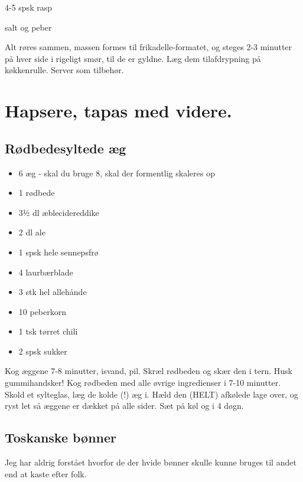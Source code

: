 \documentclass[
  letterpaper,
  DIV=11,
  numbers=noendperiod]{scrreprt}
\providecommand{\tightlist}{%
  \setlength{\itemsep}{0pt}\setlength{\parskip}{0pt}}\usepackage{longtable,booktabs,array}
\begin{document}
4-5 spsk rasp

salt og peber

Alt røres sammen, massen formes til frikadelle-formatet, og steges 2-3
minutter på hver side i rigeligt smør, til de er gyldne. Læg dem
tilafdrypning på køkkenrulle. Server som tilbehør.


\hypertarget{hapsere-tapas-med-videre.}{%
\chapter{Hapsere, tapas med videre.}\label{hapsere-tapas-med-videre.}}

\hypertarget{ruxf8dbedesyltede-uxe6g}{%
\section{Rødbedesyltede æg}\label{ruxf8dbedesyltede-uxe6g}}

\begin{itemize}
\tightlist
\item
  6 æg - skal du bruge 8, skal der formentlig skaleres op
\item
  1 rødbede
\item
  3½ dl æblecidereddike
\item
  2 dl ale
\item
  1 spsk hele sennepsfrø
\item
  4 laurbærblade
\item
  3 stk hel allehånde
\item
  10 peberkorn
\item
  1 tsk tørret chili
\item
  2 spsk sukker
\end{itemize}

Kog æggene 7-8 minutter, isvand, pil. Skræl rødbeden og skær den i tern.
Husk gummihandsker! Kog rødbeden med alle øvrige ingredienser i 7-10
minutter. Skold et sylteglas, læg de kolde (!) æg i. Hæld den (HELT)
afkølede lage over, og ryst let så æggene er dækket på alle sider. Sæt
på køl og i 4 døgn.

\hypertarget{toskanske-buxf8nner}{%
\section{Toskanske bønner}\label{toskanske-buxf8nner}}

Jeg har aldrig forstået hvorfor de der hvide bønner skulle kunne bruges
til andet end at kaste efter folk.
\end{document}
